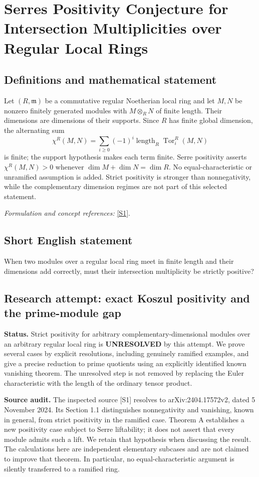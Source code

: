 \documentclass[11pt]{article}
\begin{document}
\section*{\texorpdfstring{Serres Positivity Conjecture for Intersection Multiplicities over Regular Local Rings}{Serres Positivity Conjecture for Intersection Multiplicities over Regular Local Rings}}\label{389}
\subsection{Definitions and mathematical statement}
Let $(R,\mathfrak m)$ be a commutative regular Noetherian local ring and let $M,N$ be nonzero finitely generated modules with $M\otimes_RN$ of finite length. Their dimensions are dimensions of their supports. Since $R$ has finite global dimension, the alternating sum
\[
 \chi^R(M,N)=\sum_{i\ge0}(-1)^i
 \operatorname{length}_R\operatorname{Tor}_i^R(M,N)
\]
is finite; the support hypothesis makes each term finite. Serre positivity asserts $\chi^R(M,N)>0$ whenever $\dim M+\dim N=\dim R$. No equal-characteristic or unramified assumption is added. Strict positivity is stronger than nonnegativity, while the complementary dimension regimes are not part of this selected statement.
\par\smallskip\textit{Formulation and concept references:} \href{https://arxiv.org/html/2404.17572}{[S1]}.

\subsection{Short English statement}
When two modules over a regular local ring meet in finite length and their dimensions add correctly, must their intersection multiplicity be strictly positive?
\subsection{Research attempt: exact Koszul positivity and the prime-module gap}
\textbf{Status.} Strict positivity for arbitrary complementary-dimensional modules over an arbitrary regular local ring is \textbf{UNRESOLVED} by this attempt. We prove several cases by explicit resolutions, including genuinely ramified examples, and give a precise reduction to prime quotients using an explicitly identified known vanishing theorem. The unresolved step is not removed by replacing the Euler characteristic with the length of the ordinary tensor product.

\textbf{Source audit.} The inspected source [S1] resolves to arXiv:2404.17572v2, dated 5 November 2024. Its Section 1.1 distinguishes nonnegativity and vanishing, known in general, from strict positivity in the ramified case. Theorem A establishes a new positivity case subject to Serre liftability; it does not assert that every module admits such a lift. We retain that hypothesis when discussing the result. The calculations here are independent elementary subcases and are not claimed to improve that theorem. In particular, no equal-characteristic argument is silently transferred to a ramified ring.
\end{document}
